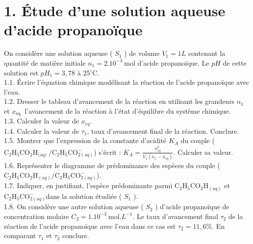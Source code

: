 \section*{1. Étude d'une solution aqueuse d'acide propanoïque}
On considère une solution aqueuse ( $S_{1}$ ) de volume $V_{1}=1 L$ contenant la quantité de matière initiale $n_{1}=2.10^{-3} \mathrm{~mol}$ d'acide propanoïque. Le $p H$ de cette solution est $p H_{1}=3,78$ à $25^{\circ} \mathrm{C}$.\\
1.1. Écrire l'équation chimique modélisant la réaction de l'acide propanoïque avec l'eau.\\
1.2. Dresser le tableau d'avancement de la réaction en utilisant les grandeurs $n_{1}$ et $x_{\text {éq }}$ l'avancement de la réaction à l'état d'équilibre du système chimique.\\
1.3. Calculer la valeur de $x_{\dot{e} q}$.\\
1.4. Calculer la valeur de $\tau_{1}$, taux d'avancement final de la réaction. Conclure.\\
1.5. Montrer que l'expression de la constante d'acidité $K_{A}$ du couple ( $\mathrm{C}_{2} \mathrm{H}_{5} \mathrm{CO}_{2} \mathrm{H}_{\text {(aq) }} / \mathrm{C}_{2} \mathrm{H}_{5} \mathrm{CO}_{2(a q)}^{-}$) s'écrit : $K_{A}=\frac{x_{\dot{e} q}^{2}}{V_{1}\left(n_{1}-x_{\dot{e} q}\right)}$. Calculer sa valeur.\\
1.6. Représenter le diagramme de prédominance des espèces du couple ( $\mathrm{C}_{2} \mathrm{H}_{5} \mathrm{CO}_{2} \mathrm{H}_{(a q)} / \mathrm{C}_{2} \mathrm{H}_{5} \mathrm{CO}_{2(a q)}^{-}$).\\
1.7. Indiquer, en justifiant, l'espèce prédominante parmi $\mathrm{C}_{2} \mathrm{H}_{5} \mathrm{CO}_{2} \mathrm{H}_{(a q)}$ et $\mathrm{C}_{2} \mathrm{H}_{5} \mathrm{CO}_{2(a q)}^{-}$dans la solution étudiée ( $S_{1}$ ).\\
1.8. On considère une autre solution aqueuse ( $S_{2}$ ) d'acide propanoïque de concentration molaire $C_{2}=1.10^{-3} \mathrm{~mol} . L^{-1}$. Le taux d'avancement final $\tau_{2}$ de la réaction de l'acide propanoïque avec l'eau dans ce cas est $\tau_{2}=11,6 \%$. En comparant $\tau_{1}$ et $\tau_{2}$ conclure.

